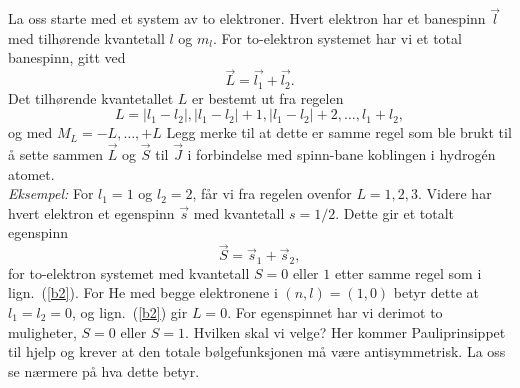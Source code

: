 La oss starte med et system av to elektroner.  Hvert
elektron har et banespinn $\vec{l}$ med tilh{\o}rende kvantetall $l$
og $m_l$.
For to-elektron systemet har vi et total banespinn,
gitt ved
%
\begin{equation}
\vec{L} = \vec{l_1} + \vec{l_2}.
\label{b1}
\end{equation}
%
Det tilh{\o}rende kvantetallet $L$ er bestemt ut fra regelen
%
\begin{equation}
L = |l_1 - l_2|, |l_1 - l_2|+1, |l_1 - l_2| +2,\ldots ,l_1 + l_2,
\label{b2}
\end{equation}
%
og med $M_L = -L,\ldots ,+L$ 
Legg merke til at dette er  samme regel som ble brukt til {\aa}
sette sammen $\vec{L}$ og $\vec{S}$ til $\vec{J}$ i forbindelse
med spinn-bane koblingen  i hydrog\'{e}n atomet.\\[2ex]
%
{\sl Eksempel:} For $l_1 = 1$ og $l_2 = 2$, f{\aa}r vi fra regelen
ovenfor $L = 1, 2, 3$.
Videre har hvert elektron et egenspinn $\vec{s}$ med kvantetall $s = 1/2$.
Dette gir et totalt egenspinn
%
\begin{equation}
\vec{S} = \vec{s}_1 + \vec{s}_2,
\label{b3}
\end{equation}
%
for to-elektron systemet med kvantetall $ S = 0$ eller $1$
etter samme regel som i lign.~(\ref{b2}).
For He med begge elektronene i $(n,l) = (1,0)$ betyr dette
at $l_1 = l_2 = 0$, og lign.~(\ref{b2}) gir $L = 0$.
For egenspinnet har vi derimot to muligheter, $S = 0$ eller $S = 1$.
Hvilken skal vi velge?  Her kommer Pauliprinsippet til hjelp og krever
at den totale b{\o}lgefunksjonen m{\aa} v{\ae}re antisymmetrisk. La oss se
n{\ae}rmere p{\aa} hva dette betyr.

